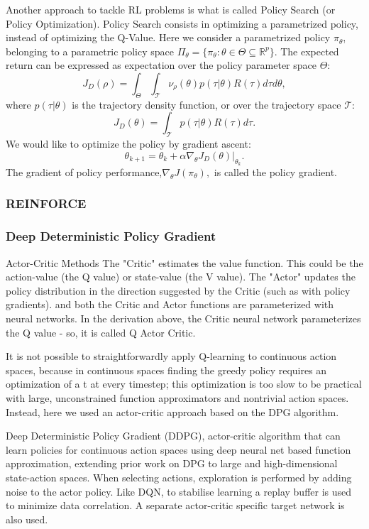 Another approach to tackle RL problems is what is called Policy Search (or Policy Optimization).
Policy Search consists in optimizing a parametrized policy, instead of optimizing the Q-Value.
Here we consider a parametrized policy $\pi_\theta$, belonging to a parametric policy space \(\Pi_\theta = \{\pi_\theta:\theta \in \Theta \subseteq \mathbb{R}^p\}\). The expected return can be expressed as expectation over the policy parameter space $\Theta$: \[\] \[ J_D(\rho) = \int_{\Theta} \int_{\mathcal{T}} \nu_\rho(\theta)p(\tau|\theta)R(\tau)d\tau d\theta, \] where $p(\tau|\theta)$ is the trajectory density function, or over the trajectory space $\mathcal{T}$: \[J_D(\theta) = \int_{\mathcal{T}} p(\tau|\theta)R(\tau)d\tau.\]
We would like to optimize the policy by gradient ascent:
\[\theta_{k+1} = \theta_k + \alpha \left. \nabla_{\theta} J_D(\theta) \right|_{\theta_k}.\]
The gradient of policy performance,\(\nabla_{\theta}J(\pi_{\theta}),\) is called the policy gradient.



\subsubsection{REINFORCE}


\subsubsection{Deep Deterministic Policy Gradient}
\label{ddpg}

{Actor-Critic Methods}
The "Critic" estimates the value function. This could be the action-value (the Q value) or state-value (the V value).
The "Actor" updates the policy distribution in the direction suggested by the Critic (such as with policy gradients).
and both the Critic and Actor functions are parameterized with neural networks. In the derivation above, the Critic neural network parameterizes the Q value - so, it is called Q Actor Critic.


It is not possible to straightforwardly apply Q-learning to continuous action spaces, because in continuous spaces finding the greedy policy requires an optimization of a t at every timestep; this optimization is too slow to be practical with large, unconstrained function approximators and nontrivial action spaces. Instead, here we used an actor-critic approach based on the DPG algorithm.






Deep Deterministic Policy Gradient (DDPG), actor-critic algorithm that can learn policies for
continuous action spaces using deep neural net based function
approximation, extending prior work on DPG to large and
high-dimensional state-action spaces. When selecting actions,
exploration is performed by adding noise to the actor policy.
Like DQN, to stabilise learning a replay buffer is used to
minimize data correlation. A separate actor-critic specific
target network is also used.











